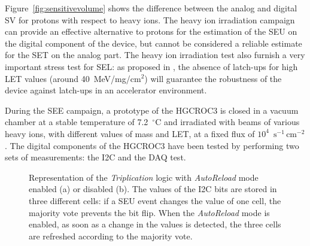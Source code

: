Figure~\ref{fig:sensitivevolume} shows the difference between the analog and digital SV for protons with respect to heavy ions.
The heavy ion irradiation campaign can provide an effective alternative to protons for the estimation of the SEU on the digital component of the device, but cannot be considered a reliable estimate for the SET on the analog part.
The heavy ion irradiation test also furnish a very important stress test for SEL: as proposed in \cite{federico}, the absence of latch-ups for high LET values (around 40~MeV/mg/$\textrm{cm}^2$) will guarantee the robustness of the device against latch-ups in an accelerator environment.

\bigbreak

During the SEE campaign, a prototype of the HGCROC3 is closed in a vacuum chamber at a stable temperature of 7.2~$^{\circ}$C and irradiated with beams of various heavy ions, with different values of mass and LET, at a fixed flux of $10^4$~$\textrm{s}^{-1}\,\textrm{cm}^{-2}$. 
The digital components of the HGCROC3 have been tested by performing two sets of measurements: the I2C and the DAQ test.

\begin{figure}
    \centering
    \hspace{1.cm}
    \caption{Representation of the \textit{Triplication} logic with \textit{AutoReload} mode enabled (a) or disabled (b). The values of the I2C bits are stored in three different cells: if a SEU event changes the value of one cell, the majority vote prevents the bit flip. When the \textit{AutoReload} mode is enabled, as soon as a change in the values is detected, the three cells are refreshed according to the majority vote.}
    \label{fig:Autoreload}
\end{figure}

